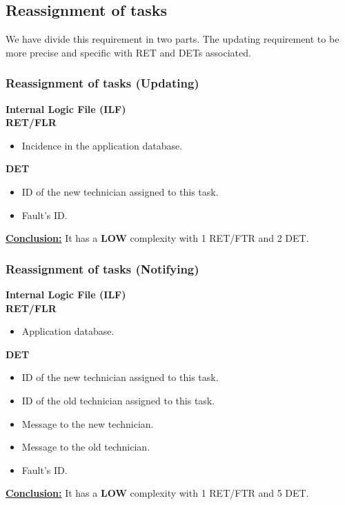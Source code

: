 \subsection{Reassignment of tasks }
We have divide this requirement in two parts. The updating requirement to be more precise and specific with RET and DETs associated.
\subsubsection{Reassignment of tasks (Updating)}
\textbf{Internal Logic File (ILF)} \\ 
\textbf{RET/FLR}
\begin{itemize}
\item Incidence in the application database.
\end{itemize}
\textbf{DET}
\begin{itemize}
\item ID of the new technician assigned to this task.
\item Fault's ID.
\end{itemize}
\textbf{\underline{Conclusion:}} It has a \textbf{LOW} complexity with 1 RET/FTR and 2 DET.

\subsubsection{Reassignment of tasks (Notifying)}
\textbf{Internal Logic File (ILF)} \\ 
\textbf{RET/FLR}
\begin{itemize}
\item Application database.
\end{itemize}
\textbf{DET}
\begin{itemize}
\item ID of the new technician assigned to this task.
\item ID of the old technician assigned to this task.
\item Message to the new technician.
\item Message to the old technician.
\item Fault's ID.

\end{itemize}
\textbf{\underline{Conclusion:}} It has a \textbf{LOW} complexity with 1 RET/FTR and 5 DET.

